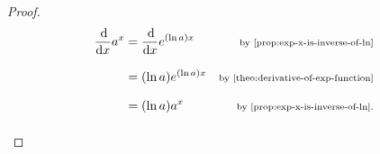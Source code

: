 \documentclass[MathsNotesBase.tex]{subfiles}
\begin{document}
{		\bigskip
		\begin{proof}
			\begin{align*}
			\frac{\dif}{\dif x}a^x &= \frac{\dif}{\dif x} e^{(\ln{a})x} &\sidecomment{by \autoref{prop:exp-x-is-inverse-of-ln}}\\[8pt]
			&= (\ln{a})e^{(\ln{a})x} &\sidecomment{by \autoref{theo:derivative-of-exp-function}} \\[8pt]
			&= (\ln{a})a^x &\sidecomment{by \autoref{prop:exp-x-is-inverse-of-ln}.} \qedhere\\[8pt]
			\end{align*}
		\end{proof}
		
	}



\end{document}
